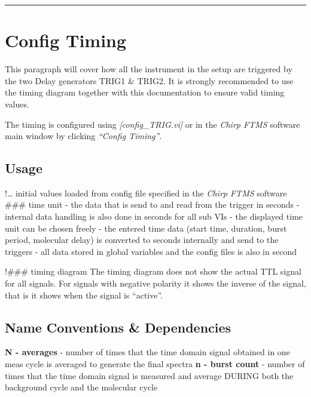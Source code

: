 \begin{center}\rule{3in}{0.4pt}\end{center}

\section{Config Timing}

This paragraph will cover how all the instrument in the setup are
triggered by the two Delay generators TRIG1 \& TRIG2. It is strongly
recommended to use the timing diagram together with this documentation
to ensure valid timing values.

The timing is configured using \emph{{[}config\_TRIG.vi{]}} or in the
\emph{Chirp FTMS} software main window by clicking \emph{``Config
Timing''}.

\subsection{Usage}

!\ldots{} initial values loaded from config file specified in the
\emph{Chirp FTMS} software \#\#\# time unit - the data that is send to
and read from the trigger in seconds - internal data handling is also
done in seconds for all sub VIs - the displayed time unit can be chosen
freely - the entered time data (start time, duration, burst period,
molecular delay) is converted to seconds internally and send to the
triggers - all data stored in global variables and the config files is
also in second

!\#\#\# timing diagram The timing diagram does not show the actual TTL
signal for all signals. For signals with negative polarity it shows the
inverse of the signal, that is it shows when the signal is ``active''.

\subsection{Name Conventions \& Dependencies}

\textbf{N - averages} - number of times that the time domain signal
obtained in one meas cycle is averaged to generate the final spectra
\textbf{n - burst count} - number of times that the time domain signal
is measured and average DURING both the background cycle and the
molecular cycle

